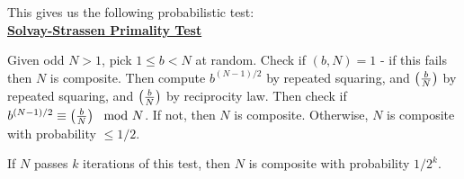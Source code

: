 \documentclass[10pt,a4paper]{article}
\begin{document}
This gives us the following probabilistic test:\\
\textbf{\underline{Solvay-Strassen Primality Test}}

Given odd $N > 1$, pick $1 \leq b <N$ at random. Check if $(b,N) = 1$ - if this fails then $N$ is composite. Then compute $b^{(N-1)/2}$ by repeated squaring, and $\left(\frac{b}{N}\right)$ by repeated squaring, and $\left(\frac{b}{N}\right)$ by reciprocity law. Then check if $b^{(N-1)/2} \equiv \left(\frac{b}{N}\right) \mod N$. If not, then $N$ is composite. Otherwise, $N$ is composite with probability $\leq 1/2$.

If $N$ passes $k$ iterations of this test, then $N$ is composite with probability $1/2^k$.
\end{document}
